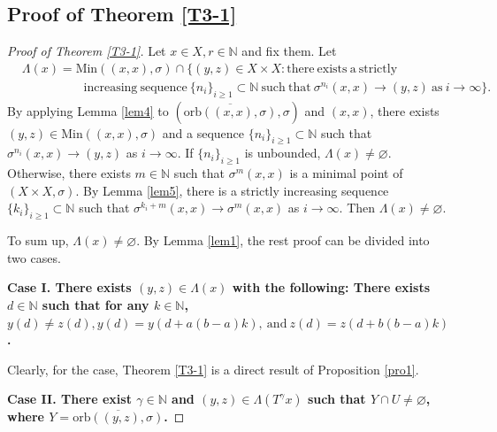 \documentclass[reqno,12pt]{amsart}
\def \N {\mathbb N}
\numberwithin{equation}{section}
\begin{document}
\subsection{Proof of Theorem \ref{T3-1}}
\begin{proof}[Proof of Theorem \ref{T3-1}]
	Let $x\in X,r\in \N$ and fix them. Let
	\begin{align*}
		& \Lambda(x)=\text{Min}((x,x),\sigma)\cap \{(y,z)\in X\times X:\text{there}\ \text{exists}\ \text{a}\ \text{strictly}\\ & \hspace{2cm}\ \text{increasing}\ \text{sequence}
		 \ \{n_i\}_{i\ge 1}\subset \N\ \text{such}\ \text{that}\ \sigma^{n_i}(x,x)\to (y,z)\ \text{as}\ i\to\infty\}.
	\end{align*}
	By applying Lemma \ref{lem4} to $(\overline{\text{orb}((x,x),\sigma)},\sigma)$ and $(x,x)$, there exists $(y,z)\in \text{Min}((x,x),\sigma)$ and a sequence $\{n_i\}_{i\ge 1}\subset \N$ such that $ \sigma^{n_i}(x,x)\to (y,z)$ as $i\to\infty$. If $\{n_i\}_{i\ge 1}$ is unbounded, $\Lambda(x)\neq \varnothing$. Otherwise, there exists $m\in\N$ such that $\sigma^{m}(x,x)$ is a minimal point of $(X\times X,\sigma)$. By Lemma \ref{lem5}, there is a strictly increasing sequence $\{k_i\}_{i\ge 1}\subset \N$ such that $ \sigma^{k_i+m}(x,x)\to \sigma^{m}(x,x)$ as $i\to\infty$. Then $\Lambda(x)\neq \varnothing$.
	
	To sum up, $\Lambda(x)\neq \varnothing$. By Lemma \ref{lem1}, the rest proof can be divided into two cases.
	
	\noindent \textbf{Case I. There exists $(y,z)\in \Lambda(x)$ with the following: There exists $d\in \N$ such that for any $k\in \N$,
		$y(d)\neq z(d),y(d)=y(d+a(b-a)k),\ \text{and}\ z(d)=z(d+b(b-a)k)$.}
	
	Clearly, for the case, Theorem \ref{T3-1} is a direct result of Proposition \ref{pro1}.
	
	\noindent \textbf{Case II. There exist $\gamma\in\N$ and $(y,z)\in \Lambda(T^{\gamma}x)$ such that $Y\cap U\neq \varnothing$, where $Y=\overline{\text{orb}((y,z),\sigma)}$.}
	

\end{proof}
\end{document}
